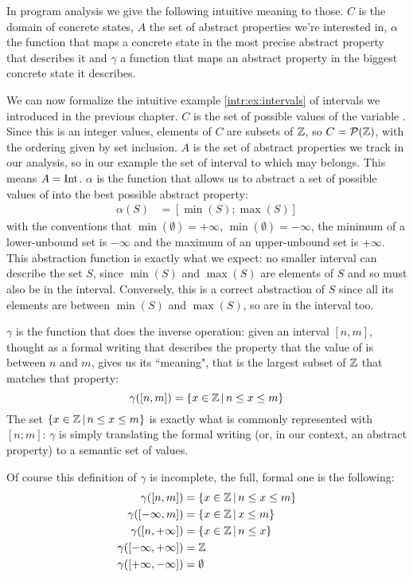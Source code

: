In program analysis we give the following intuitive meaning to those. $C$ is the domain of concrete states, $A$ the set of abstract properties we're interested in, $\alpha$ the function that maps a concrete state in the most precise abstract property that describes it and $\gamma$ a function that maps an abstract property in the biggest concrete state it describes.

\begin{example}[Intervals]
	We can now formalize the intuitive example \ref{intr:ex:intervals} of intervals we introduced in the previous chapter.
	$C$ is the set of possible values of the variable . Since this is an integer values, elements of $C$ are subsets of $\mathbb{Z}$, so $C = \mathcal{P}(\mathbb{Z})$, with the ordering given by set inclusion. $A$ is the set of abstract properties we track in our analysis, so in our example the set of interval to which  may belongs. This means $A = \text{Int}$.
	$\alpha$ is the function that allows us to abstract a set of possible values of  into the best possible abstract property:
	\begin{align*}
		\alpha(S) &= [\min(S); \max(S)]
	\end{align*}
	with the conventions that $\min(\emptyset) = +\infty$, $\min(\emptyset) = -\infty$, the minimum of a lower-unbound set is $-\infty$ and the maximum of an upper-unbound set is $+\infty$. This abstraction function is exactly what we expect: no smaller interval can describe the set $S$, since $\min(S)$ and $\max(S)$ are elements of $S$ and so must also be in the interval. Conversely, this is a correct abstraction of $S$ since all its elements are between $\min(S)$ and $\max(S)$, so are in the interval too.
	
	$\gamma$ is the function that does the inverse operation: given an interval $[n, m]$, thought as a formal writing that describes the property that the value of  is between $n$ and $m$, gives us its ``meaning", that is the largest subset of $\mathbb{Z}$ that matches that property:
	\[
	\gamma([n, m]) = \{ x \in \mathbb{Z} \,\vert\, n \le x \le m \}
	\]
	The set $\{ x \in \mathbb{Z} \,\vert\, n \le x \le m \}$ is exactly what is commonly represented with $[n; m]$: $\gamma$ is simply translating the formal writing (or, in our context, an abstract property) to a semantic set of values.

	Of course this definition of $\gamma$ is incomplete, the full, formal one is the following:
	\begin{align*}
		\gamma([n, m]) &= \{ x \in \mathbb{Z} \,\vert\, n \le x \le m \} \\
		\gamma([-\infty, m]) &= \{ x \in \mathbb{Z} \,\vert\, x \le m \} \\
		\gamma([n, +\infty]) &= \{ x \in \mathbb{Z} \,\vert\, n \le x \} \\
		\gamma([-\infty, +\infty]) &= \mathbb{Z} \\
		\gamma([+\infty, -\infty]) &= \emptyset
	\end{align*}


\end{example}
